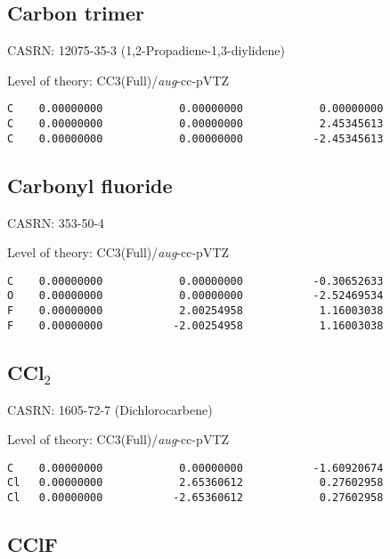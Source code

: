 \documentclass[journal=jctcce,manuscript=article,layout=traditional]{achemso}
\newcommand{\AVTZ}{\emph{aug}-cc-pVTZ}
\begin{document}
\subsection{Carbon trimer}

CASRN: 12075-35-3 (1,2-Propadiene-1,3-diylidene)

\begin{singlespace}
\noindent Level of theory: CC3(Full)/{\AVTZ}
\begin{verbatim}
C    0.00000000            0.00000000            0.00000000
C    0.00000000            0.00000000            2.45345613
C    0.00000000            0.00000000           -2.45345613
\end{verbatim}
\end{singlespace}

\subsection{Carbonyl fluoride}

CASRN: 353-50-4

\begin{singlespace}
\noindent Level of theory: CC3(Full)/{\AVTZ}
\begin{verbatim}
C    0.00000000            0.00000000           -0.30652633
O    0.00000000            0.00000000           -2.52469534
F    0.00000000            2.00254958            1.16003038
F    0.00000000           -2.00254958            1.16003038
\end{verbatim}
\end{singlespace}

\subsection{CCl$_2$}

CASRN: 1605-72-7 (Dichlorocarbene)

\begin{singlespace}
\noindent Level of theory: CC3(Full)/{\AVTZ}
\begin{verbatim}
C    0.00000000            0.00000000           -1.60920674
Cl   0.00000000            2.65360612            0.27602958
Cl   0.00000000           -2.65360612            0.27602958
\end{verbatim}
\end{singlespace}

\subsection{CClF}
\end{document}
